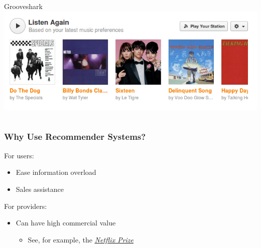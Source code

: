 \documentclass{beamer}
\begin{document}
\begin{frame}
\begin{columns}
        \centering Grooveshark\\
        \includegraphics[width=\linewidth]{grooveshark}
    \end{columns}
\end{frame}

\begin{frame}
    \frametitle{Why Use Recommender Systems?}
    For users:
    \begin{itemize}
    \item Ease information overload
    \item Sales assistance
    \end{itemize}
    \vsep
    For providers:
    \begin{itemize}
    \item Can have high commercial value
        \begin{itemize}
        \item See, for example, the
            \emph{\href{http://www.netflixprize.com/}{\underline{Netflix
                  Prize}}}
        \end{itemize}
    \end{itemize}
\end{frame}
\end{document}
